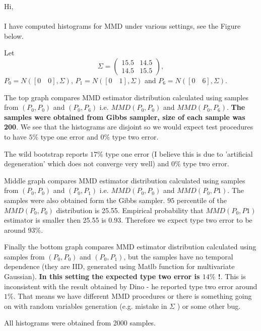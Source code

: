 \documentclass[11pt,a4paper]{report}
\begin{document}
Hi,
\\
\\
I have computed histograms for MMD under various settings, see the Figure below.

Let
$$\Sigma = \left( \begin{array}{cc} 15.5&14.5\\ 14.5&15.5 \end{array} \right),$$
$P_0 = N([0 \quad 0],\Sigma)$, $P_1 = N([0 \quad 1],\Sigma)$ and $P_6 = N([0 \quad 6],\Sigma)$. 

The top graph compares MMD estimator distribution calculated using samples from $(P_0,P_0)$ and $(P_0,P_6)$ i.e. $MMD(P_0,P_0)$ and $MMD(P_0,P_6)$. \textbf{The samples were obtained from Gibbs sampler, size of each sample was 200}. We see that the histograms are disjoint so we would expect test procedures to have $5\%$ type one error and $0\%$ type two error.

The wild bootstrap reports $17 \%$ type one error (I believe this is  due to  'artificial degeneration' which does not converge very well) and $0\%$ type two error. 

Middle graph compares MMD estimator distribution calculated using samples from $(P_0,P_0)$ and $(P_0,P_1)$ i.e. $MMD(P_0,P_0)$ and $MMD(P_0,P1)$. The samples were also obtained form the Gibbs sampler. $95$ percentile  of the $MMD(P_0,P_0)$ distribution is 25.55. Empirical probability that  $MMD(P_0,P1)$ estimator is smaller then 25.55 is 0.93. Therefore we expect type two error to be around $93\%$.

Finally the bottom graph  compares MMD estimator distribution calculated using samples from $(P_0,P_0)$ and $(P_0,P_1)$, but the samples have no temporal dependence (they are IID, generated using Matlb function for multivariate Gaussian).  \textbf{ In this setting the expected type two error is $14 \%$ !}. This is  inconsistent with the result obtained by Dino - he reported type two error around $1\%$. That means we have different MMD procedures or there is something going on with random variables generation (e.g. mistake in $\Sigma$ ) or some other bug. 

All histograms were obtained from 2000 samples.   
\end{document}
